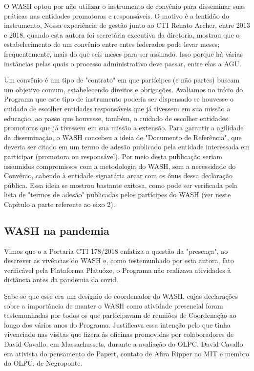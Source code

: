 O WASH optou por não utilizar o instrumento de convênio para disseminar suas práticas nas entidades promotoras e responsáveis. O motivo é a lentidão do instrumento, Nossa experiência de gestão junto ao CTI Renato Archer, entre 2013 e 2018, quando esta autora foi secretária executiva da  diretoria, mostrou que o estabelecimento de um convênio entre entes federados pode levar meses; frequentemente, mais do que seis meses para ser assinado. Isso porque há várias instâncias pelas quais o processo administrativo deve passar, entre elas a AGU.

Um convênio é um tipo de "contrato" em que partícipes (e não partes) buscam um objetivo comum, estabelecendo direitos e obrigações. Avaliamos no início do Programa que este tipo de instrumento poderia ser dispensado se houvesse o cuidado de escolher entidades responsáveis que já tivessem em sua missão a educação, ao passo que houvesse, também, o cuidado de escolher entidades promotoras que já tivessem em sua missão a extensão. Para garantir a agilidade da disseminação, o WASH concebeu a ideia de "Documento de Referência", que deveria ser citado em um termo de adesão publicado pela entidade interessada em participar (promotora ou responsável). Por meio desta publicação seriam assumidos compromissos com a metodologia do WASH, sem a necessidade do Convênio, cabendo à entidade signatária arcar com os ônus dessa declaração pública. Essa ideia se mostrou bastante exitosa, como pode ser verificada pela lista de "termos de adesão" publicadas pelos partícipes do WASH (ver neste Capítulo a parte referente ao eixo 2).

\subsection[WASH na pandemia]{WASH na pandemia}\label{WASH na pandemia}
Vimos que o a Portaria CTI 178/2018 enfatiza a questão da "presença", ao descrever as vivências do WASH e, como testemunhado por esta autora, fato verificável pela Plataforma Platuóxe, o Programa não realizava atividades à distância antes da pandemia da covid.

Sabe-se que esse era um desígnio do coordenador do WASH, cujas declarações sobre a importância de manter o WASH como atividade presencial foram testemunhadas por todos os que participavam de reuniões de Coordenação ao longo dos vários anos do Programa. Justificava essa intenção pelo que tinha vivenciado nas visitas que fizera às oficinas promovidas por colaboradores de David Cavallo, em Massachussets, durante a avaliação do OLPC. David Cavallo era ativista do pensamento de Papert, contato de Afira Ripper no MIT e membro do OLPC, de Negroponte.

